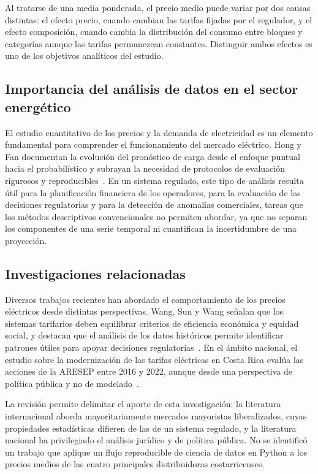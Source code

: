 \documentclass[conference]{IEEEtran}
\begin{document}
Al tratarse de una media ponderada, el precio medio puede variar por dos causas distintas: el efecto precio, cuando cambian las tarifas fijadas por el regulador, y el efecto composici\'on, cuando cambia la distribuci\'on del consumo entre bloques y categor\'ias aunque las tarifas permanezcan constantes. Distinguir ambos efectos es uno de los objetivos anal\'iticos del estudio.

\subsection{Importancia del an\'alisis de datos en el sector energ\'etico}

El estudio cuantitativo de los precios y la demanda de electricidad es un elemento fundamental para comprender el funcionamiento del mercado el\'ectrico. Hong y Fan documentan la evoluci\'on del pron\'ostico de carga desde el enfoque puntual hacia el probabil\'istico y subrayan la necesidad de protocolos de evaluaci\'on rigurosos y reproducibles~\cite{r7}. En un sistema regulado, este tipo de an\'alisis resulta \'util para la planificaci\'on financiera de los operadores, para la evaluaci\'on de las decisiones regulatorias y para la detecci\'on de anomal\'ias comerciales, tareas que los m\'etodos descriptivos convencionales no permiten abordar, ya que no separan los componentes de una serie temporal ni cuantifican la incertidumbre de una proyecci\'on.

\subsection{Investigaciones relacionadas}

Diversos trabajos recientes han abordado el comportamiento de los precios el\'ectricos desde distintas perspectivas. Wang, Sun y Wang se\~nalan que los sistemas tarifarios deben equilibrar criterios de eficiencia econ\'omica y equidad social, y destacan que el an\'alisis de los datos hist\'oricos permite identificar patrones \'utiles para apoyar decisiones regulatorias~\cite{r8}. En el \'ambito nacional, el estudio sobre la modernizaci\'on de las tarifas el\'ectricas en Costa Rica eval\'ua las acciones de la ARESEP entre 2016 y 2022, aunque desde una perspectiva de pol\'itica p\'ublica y no de modelado~\cite{r9}.

La revisi\'on permite delimitar el aporte de esta investigaci\'on: la literatura internacional aborda mayoritariamente mercados mayoristas liberalizados, cuyas propiedades estad\'isticas difieren de las de un sistema regulado, y la literatura nacional ha privilegiado el an\'alisis jur\'idico y de pol\'itica p\'ublica. No se identific\'o un trabajo que aplique un flujo reproducible de ciencia de datos en Python a los precios medios de las cuatro principales distribuidoras costarricenses.
\end{document}
